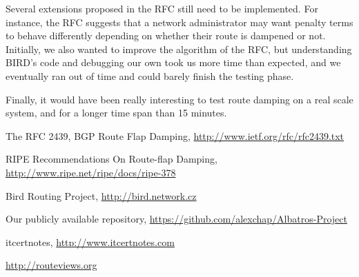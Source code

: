 \documentclass[a4paper,english]{IEEEtran}
\begin{document}
Several extensions proposed in the RFC still need to be implemented.
For instance, the RFC suggests that a network administrator may want penalty terms to behave differently depending on whether their route is dampened or not.
Initially, we also wanted to improve the algorithm of the RFC, but understanding BIRD's code and debugging our own took us more time than expected, and we eventually ran out of time and could barely finish the testing phase.

Finally, it would have been really interesting to test route damping on a real scale system, and for a longer time span than 15 minutes.

\begin{thebibliography}{6}

The RFC 2439, BGP Route Flap Damping, \href{http://www.ietf.org/rfc/rfc2439.txt}{http://www.ietf.org/rfc/rfc2439.txt}

 RIPE Recommendations On Route-flap
Damping, \href{http://www.ripe.net/ripe/docs/ripe-378}{http://www.ripe.net/ripe/docs/ripe-378}

Bird Routing Project, \href{http://bird.network.cz}{http://bird.network.cz}

Our publicly available repository, \href{https://github.com/alexchap/Albatros-Project}{https://github.com/alexchap/Albatros-Project}

itcertnotes, \href{www.itcertnotes.com}{http://www.itcertnotes.com}

\href{http://routeviews.org}{http://routeviews.org} 

\end{thebibliography}
\end{document}
